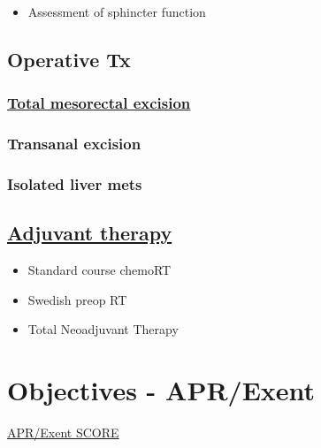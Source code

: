 \documentclass[
]{book}
\providecommand{\tightlist}{%
  \setlength{\itemsep}{0pt}\setlength{\parskip}{0pt}}
\begin{document}
\begin{itemize}
\tightlist
\item
  Assessment of sphincter function
\end{itemize}

\hypertarget{operative-tx}{%
\section{Operative Tx}\label{operative-tx}}

\hypertarget{total-mesorectal-excision}{%
\subsection{\texorpdfstring{\href{767-rectal_surgery.html}{Total mesorectal excision}}{Total mesorectal excision}}\label{total-mesorectal-excision}}

\hypertarget{transanal-excision}{%
\subsection{Transanal excision}\label{transanal-excision}}

\hypertarget{isolated-liver-mets}{%
\subsection{Isolated liver mets}\label{isolated-liver-mets}}

\hypertarget{adjuvant-therapy}{%
\section{\texorpdfstring{\href{770-rectal_RT.html}{Adjuvant therapy}}{Adjuvant therapy}}\label{adjuvant-therapy}}

\begin{itemize}
\tightlist
\item
  Standard course chemoRT
\item
  Swedish preop RT
\item
  Total Neoadjuvant Therapy
\end{itemize}

\hypertarget{objectives---aprexent}{%
\chapter{Objectives - APR/Exent}\label{objectives---aprexent}}

\href{https://www.surgicalcore.org/modulecontent.aspx?id=162148}{APR/Exent SCORE}
\end{document}
